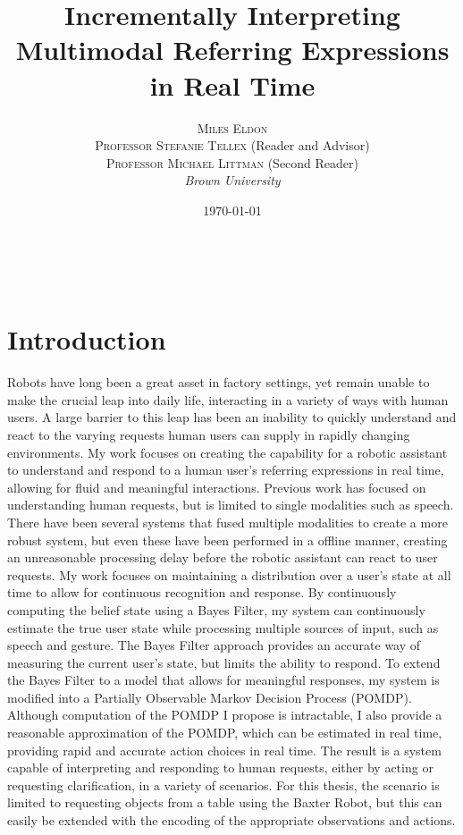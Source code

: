 \documentclass[a4paper, 11pt]{article} %
\title{\textbf{Incrementally Interpreting Multimodal Referring Expressions in Real Time}} %
\author{\textsc{Miles Eldon}\\ %
\textsc{Professor Stefanie Tellex} (Reader and Advisor)\\
{\textsc{Professor Michael Littman} (Second Reader)}
\\{\textit{Brown University}}} %
\date{\today} %
\makeatletter
\renewcommand{\maketitle}{ %
\begin{flushright} %
{\LARGE\@title} %

\vspace{50pt} %

{\large\@author} %
\\\@date %

\vspace{40pt} %
\end{flushright}
}
\makeatother
\begin{document}
\maketitle %

\section{Introduction}
Robots have long been a great asset in factory settings, yet remain unable to make the crucial leap into daily life, interacting in a variety of ways with human users. A large barrier to this leap has been an inability to quickly understand and react to the varying requests human users can supply in rapidly changing environments. My work focuses on creating the capability for a robotic assistant to understand and respond to a human user's referring expressions in real time, allowing for fluid and meaningful interactions. Previous work has focused on understanding human requests, but is limited to single modalities such as speech. There have been several systems that fused multiple modalities to create a more robust system, but even these have been performed in a offline manner, creating an unreasonable processing delay before the robotic assistant can react to user requests. My work focuses on maintaining a distribution over a user's state at all time to allow for continuous recognition and response. By continuously computing the belief state using a Bayes Filter, my system can continuously estimate the true user state while processing multiple sources of input, such as speech and gesture. The Bayes Filter approach provides an accurate way of measuring the current user's state, but limits the ability to respond. To extend the Bayes Filter to a model that allows for meaningful responses, my system is modified into a Partially Observable Markov Decision Process (POMDP). Although computation of the POMDP I propose is intractable, I also provide a reasonable approximation of the POMDP, which can be estimated in real time, providing rapid and accurate action choices in real time. The result is a system capable of interpreting and responding to human requests, either by acting or requesting clarification, in a variety of scenarios. For this thesis, the scenario is limited to requesting objects from a table using the Baxter Robot, but this can easily be extended with the encoding of the appropriate observations and actions.
\end{document}
